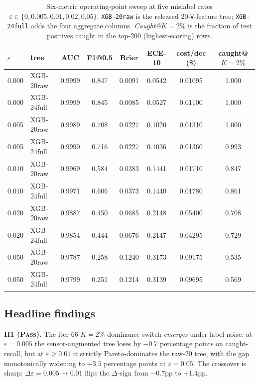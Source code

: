 \begin{table}[t]
\centering\small
\caption{Six-metric operating-point sweep at five mislabel rates
$\varepsilon \in \{0, 0.005, 0.01, 0.02, 0.05\}$. \texttt{XGB-20raw} is
the released 20-\texttt{V}-feature tree; \texttt{XGB-24full} adds the
four aggregate columns. \emph{Caught@$K{=}2\%$} is the fraction of
test positives caught in the top-200 (highest-scoring) rows.}
\label{tab:p8-mislabel-main}
\begin{tabular}{llcccccc}
\toprule
$\varepsilon$ & tree       & AUC    & F1@0.5 & Brier & ECE-10 & cost/dec (\$) & caught@$K{=}2\%$ \\
\midrule
0.000 & XGB-20raw  & 0.9999 & 0.847  & 0.0091 & 0.0542 & 0.01095 & 1.000 \\
0.000 & XGB-24full & 0.9999 & 0.845  & 0.0085 & 0.0527 & 0.01100 & 1.000 \\
0.005 & XGB-20raw  & 0.9989 & 0.708  & 0.0227 & 0.1020 & 0.01310 & 1.000 \\
0.005 & XGB-24full & 0.9990 & 0.716  & 0.0227 & 0.1036 & 0.01360 & 0.993 \\
0.010 & XGB-20raw  & 0.9969 & 0.584  & 0.0383 & 0.1441 & 0.01710 & 0.847 \\
0.010 & XGB-24full & 0.9971 & 0.606  & 0.0373 & 0.1440 & 0.01780 & 0.861 \\
0.020 & XGB-20raw  & 0.9887 & 0.450  & 0.0685 & 0.2148 & 0.05400 & 0.708 \\
0.020 & XGB-24full & 0.9854 & 0.444  & 0.0676 & 0.2147 & 0.04295 & 0.729 \\
0.050 & XGB-20raw  & 0.9787 & 0.258  & 0.1240 & 0.3173 & 0.09175 & 0.535 \\
0.050 & XGB-24full & 0.9799 & 0.251  & 0.1214 & 0.3139 & 0.09695 & 0.569 \\
\bottomrule
\end{tabular}
\end{table}

\subsection{Headline findings}

\textbf{H1 (\textsc{Pass}).} The iter-66 $K{=}2\%$ dominance switch
\emph{emerges} under label noise: at $\varepsilon{=}0.005$ the
sensor-augmented tree loses by $-0.7$ percentage points on
caught-recall, but at $\varepsilon{\geq}0.01$ it strictly Pareto-dominates
the raw-20 tree, with the gap monotonically widening to $+3.5$ percentage
points at $\varepsilon{=}0.05$. The crossover is sharp:
$\Delta\varepsilon{=}0.005 \to 0.01$ flips the $\Delta$-sign from
$-0.7$pp to $+1.4$pp.

